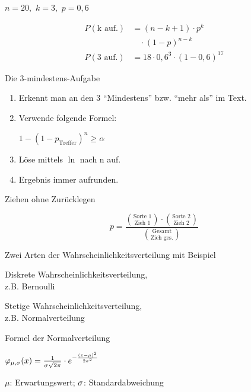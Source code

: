 \documentclass[paper=a6,ngerman,twoside=true,fontsize=14pt, parskip = half]{scrartcl}
\begin{document}
\begin{antwort}
	$n=20,$ $k=3,$ $p=0,6$
	
	\bigskip
	\begin{align*}
	P(\text{k auf.})&=(n-k+1)\cdot p^{k}\\
	&\quad\cdot (1-p)^{n-k} \\
	P(\text{3 auf.})&=18\cdot 0,6^{3} \cdot (1-0,6)^{17}
	\end{align*}
	
\end{antwort}
\begin{frage}
	Die 3-mindestens-Aufgabe
	
\end{frage}
\begin{antwort}
	\begin{enumerate}
		\item Erkennt man an den 3 \enquote{Mindestens} bzw. \enquote{mehr als} 
			im Text. 
		\item Verwende folgende Formel:
		
		 $1-(1-p_{\text{Treffer}})^n\geq \alpha$
		\item Löse mittels $\ln$ nach  n auf.
		\item Ergebnis immer aufrunden.
	\end{enumerate}
	
\end{antwort}
\begin{frage}
	Ziehen ohne Zurücklegen
	
\end{frage}
\begin{antwort}
	\[
	 p=\frac{\binom{\text{Sorte 1}}{\text{Zieh 1}} \cdot \binom{\text{Sorte 2}}{\text{Zieh 2}}}{\binom{\text{Gesamt}}{\text{Zieh ges.}}}
	 \]
	
\end{antwort}
\begin{frage}
	Zwei Arten der Wahrscheinlichkeitsverteilung mit Beispiel
	
\end{frage}
\begin{antwort}
	Diskrete Wahrscheinlichkeitsverteilung, \\ z.B. Bernoulli

	Stetige Wahrscheinlichkeitsverteilung, \\ z.B. Normalverteilung
\end{antwort}	
\begin{frage}
	Formel der Normalverteilung
\end{frage}
\begin{antwort}
	\begin{center}
		$\varphi_{\mu,\sigma}(x)=\frac{1}{\sigma\sqrt{2\pi}}\cdot e^{-\frac{(x-\mu)^2}{2\sigma^2}}$
		\vspace{1cm}
		
		$\mu$: Erwartungswert; $\sigma$: Standardabweichung
	\end{center}
\end{antwort}	
\end{document}
